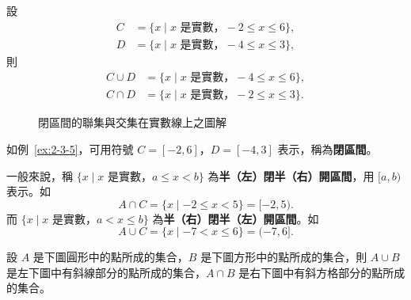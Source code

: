 \begin{enumerate}[(一)]
  \begin{example}\label{ex:2-3-6}
  設 
  \begin{align*}
    C &= \{x \mid x \text{ 是實數，} -2 \le x \le 6\}, \\
    D &= \{x \mid x \text{ 是實數，} -4 \le x \le 3\},
  \end{align*}
  則
  \begin{align*}
    C \cup D &= \{x \mid x \text{ 是實數，} -4 \le x \le 6\}, \\
    C \cap D &= \{x \mid x \text{ 是實數，} -2 \le x \le 3\}.
  \end{align*}

  \begin{figure}[htbp]
  \centering
  \caption{閉區間的聯集與交集在實數線上之圖解}\label{fig:closed_intervals}
  \end{figure}

  如例~\ref{ex:2-3-5}，可用符號 $C = [-2, 6]$，$D = [-4, 3]$ 表示，稱為\textbf{閉區間}。

  一般來說，稱 $\{x \mid x \text{ 是實數，} a \le x < b\}$ 為\textbf{半（左）閉半（右）開區間}，用 $[a, b)$ 表示。如
  \begin{equation*}
    A \cap C = \{x \mid -2 \le x < 5\} = [-2, 5).
  \end{equation*}
  而 $\{x \mid x \text{ 是實數，} a < x \le b\}$ 為\textbf{半（右）閉半（左）開區間}。如
  \begin{equation*}
    A \cup C = \{x \mid -7 < x \le 6\} = (-7, 6].
  \end{equation*}
  \end{example}

  \begin{example}\label{ex:2-3-7}
  設 $A$ 是下圖圓形中的點所成的集合，$B$ 是下圖方形中的點所成的集合，則 $A \cup B$ 是左下圖中有斜線部分的點所成的集合，$A \cap B$ 是右下圖中有斜方格部分的點所成的集合。


\end{example}
\end{enumerate}
